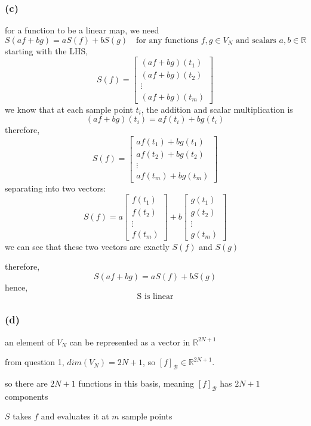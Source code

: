 \documentclass{article}
\begin{document}
\subsubsection*{(c)}
for a function to be a linear map, we need
\[
S(af+bg)=aS(f)+bS(g) \quad \text{for any functions } f, g \in V_N \text{ and scalars } a, b \in \mathbb{R}
\]
starting with the LHS,
\[
S(f) = 
\begin{bmatrix}
    (af+bg)(t_1)\\
    (af+bg)(t_2)\\
    \vdots\\
    (af+bg)(t_m)
\end{bmatrix}
\]
we know that at each sample point $t_i$, the addition and scalar multiplication is
\[
(af+bg)(t_i)=af(t_i)+bg(t_i)
\]
therefore,
\[
S(f) = 
\begin{bmatrix}
    af(t_1) + bg(t_1)\\
    af(t_2) + bg(t_2)\\
    \vdots\\
    af(t_m) + bg(t_m)
\end{bmatrix}
\]
separating into two vectors:
\[
S(f) = 
a
\begin{bmatrix}
    f(t_1)\\
    f(t_2)\\
    \vdots\\
    f(t_m)
\end{bmatrix}
+
b
\begin{bmatrix}
    g(t_1)\\
    g(t_2)\\
    \vdots\\
    g(t_m)
\end{bmatrix}
\]
we can see that these two vectors are exactly $S(f)$ and $S(g)$

therefore, $$S(af+bg) = aS(f)+bS(g)$$
hence, $$\boxed{\text{S is linear}}$$

\subsubsection*{(d)}
an element of $V_N$ can be represented as a vector in $\mathbb{R}^{2N+1}$

from question 1, $dim(V_N)=2N+1$, so $[f]_\mathcal{B} \in \mathbb{R}^{2N+1}$.

so there are $2N+1$ functions in this basis, meaning $[f]_\mathcal{B}$ has $2N+1$ components

$S$ takes $f$ and evaluates it at $m$ sample points
\end{document}
